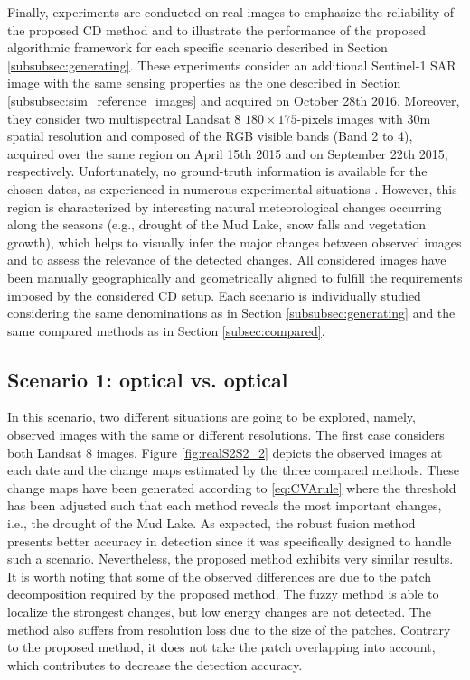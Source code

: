 \documentclass[review]{elsarticle}
\begin{document}
Finally, experiments are conducted on real images to emphasize the reliability of the proposed CD method and to illustrate the performance of the proposed algorithmic framework for each specific scenario described in Section \ref{subsubsec:generating}. These experiments consider an additional Sentinel-1 SAR image with the same sensing properties as the one described in Section \ref{subsubsec:sim_reference_images} and acquired on October 28th 2016. Moreover, they consider two multispectral Landsat 8 \citep{united_states_geological_survey_landsat_2017} $180 \times 175$-pixels images with $30$m spatial resolution and composed of the RGB visible bands (Band 2 to 4), acquired over the same region on April 15th 2015 and on September 22th 2015, respectively. Unfortunately, no ground-truth information is available for the chosen dates, as experienced in numerous experimental situations \citep{bovolo_time_2015}. However, this region is characterized by interesting natural meteorological changes occurring along the seasons (e.g., drought of the Mud Lake, snow falls and vegetation growth), which helps to visually infer the major changes between observed images and to assess the relevance of the detected changes. All considered images have been manually geographically and geometrically aligned to fulfill the requirements imposed by the considered CD setup. Each scenario is individually studied considering the same denominations as in Section \ref{subsubsec:generating} and the same compared methods as in Section \ref{subsec:compared}.

\subsection{Scenario 1: optical vs. optical}

In this scenario, two different situations are going to be explored, namely, observed images with the same or different resolutions. The first case considers both Landsat 8 images. Figure \ref{fig:realS2S2_2} depicts the observed images at each date and the change maps estimated by the three compared methods. These change maps have been generated according to \eqref{eq:CVArule} where the threshold has been adjusted such that each method reveals the most important changes, i.e., the drought of the Mud Lake. As expected, the robust fusion method presents better accuracy in detection since it was specifically designed to handle such a scenario. Nevertheless, the proposed method exhibits very similar results. It is worth noting that some of the observed differences are due to the patch decomposition required by the proposed method. The fuzzy method is able to localize the strongest changes, but low energy changes are not detected. The method also suffers from resolution loss due to the size of the patches. Contrary to the proposed method, it does not take the patch overlapping into account, which contributes to decrease the detection accuracy.
\end{document}
